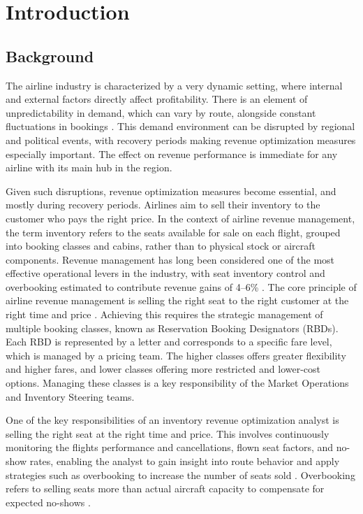 \chapter{Introduction}
\label{ch:introduction}

\section{Background}
\label{sec:background}

The airline industry is characterized by a very dynamic setting, where internal and external factors directly affect profitability. There is an element of unpredictability in demand, which can vary by route, alongside constant fluctuations in bookings \citep{PakPiersma2002, Belobaba1987}. This demand environment can be disrupted by regional and political events, with recovery periods making revenue optimization measures especially important. The effect on revenue performance is immediate for any airline with its main hub in the region.

Given such disruptions, revenue optimization measures become essential, and mostly during recovery periods. Airlines aim to sell their inventory to the customer who pays the right price. In the context of airline revenue management, the term inventory refers to the seats available for sale on each flight, grouped into booking classes and cabins, rather than to physical stock or aircraft components. Revenue management has long been considered one of the most effective operational levers in the industry, with seat inventory control and overbooking estimated to contribute revenue gains of 4--6\% \citep{Belobaba1989, PakPiersma2002}. The core principle of airline revenue management is selling the right seat to the right customer at the right time and price \citep{TalluriVanRyzin2004}. Achieving this requires the strategic management of multiple booking classes, known as Reservation Booking Designators (RBDs). Each RBD is represented by a letter and corresponds to a specific fare level, which is managed by a pricing team. The higher classes offers greater flexibility and higher fares, and lower classes offering more restricted and lower-cost options. Managing these classes is a key responsibility of the Market Operations and Inventory Steering teams.

One of the key responsibilities of an inventory revenue optimization analyst is selling the right seat at the right time and price. This involves continuously monitoring the flights performance and cancellations, flown seat factors, and no-show rates, enabling the analyst to gain insight into route behavior and apply strategies such as overbooking to increase the number of seats sold \citep{Belobaba1987}. Overbooking refers to selling seats more than actual aircraft capacity to compensate for expected no-shows \citep{Chatwin1999, SubramanianStidhamLautenbacher1999}.

